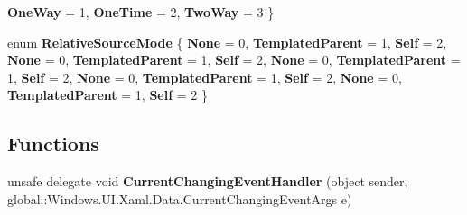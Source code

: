 \begin{DoxyCompactItemize}
{\bfseries One\+Way} = 1, 
{\bfseries One\+Time} = 2, 
{\bfseries Two\+Way} = 3
 \}
\item 
\mbox{\label{namespace_windows_1_1_u_i_1_1_xaml_1_1_data_a5e4ee6dff370c4af738541df52d97b7f}} 
enum {\bfseries Relative\+Source\+Mode} \{ \newline
{\bfseries None} = 0, 
{\bfseries Templated\+Parent} = 1, 
{\bfseries Self} = 2, 
{\bfseries None} = 0, 
\newline
{\bfseries Templated\+Parent} = 1, 
{\bfseries Self} = 2, 
{\bfseries None} = 0, 
{\bfseries Templated\+Parent} = 1, 
\newline
{\bfseries Self} = 2, 
{\bfseries None} = 0, 
{\bfseries Templated\+Parent} = 1, 
{\bfseries Self} = 2, 
\newline
{\bfseries None} = 0, 
{\bfseries Templated\+Parent} = 1, 
{\bfseries Self} = 2
 \}
\end{DoxyCompactItemize}
\subsection*{Functions}
\begin{DoxyCompactItemize}
\item 
\mbox{\label{namespace_windows_1_1_u_i_1_1_xaml_1_1_data_ac2e82aef81e2a4f9f0b26113b1595776}} 
unsafe delegate void {\bfseries Current\+Changing\+Event\+Handler} (object sender, global\+::\+Windows.\+U\+I.\+Xaml.\+Data.\+Current\+Changing\+Event\+Args e)
\end{DoxyCompactItemize}

